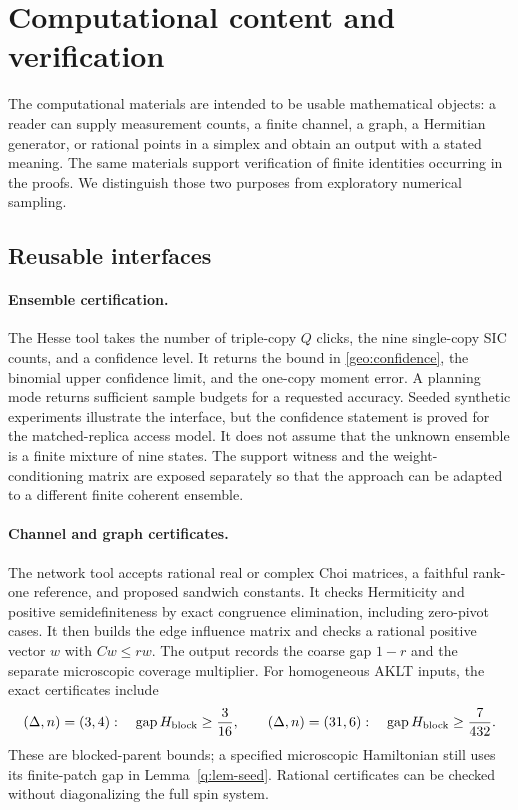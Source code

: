 \section{Computational content and verification}
\label{sec:verification}

The computational materials are intended to be usable mathematical
objects: a reader can supply measurement counts, a finite channel, a graph,
a Hermitian generator, or rational points in a simplex and obtain an output
with a stated meaning.
The same materials support verification of finite identities occurring in
the proofs. We distinguish those two purposes from exploratory numerical
sampling.

\subsection{Reusable interfaces}

\paragraph{Ensemble certification.}
The Hesse tool takes the number of triple-copy $Q$ clicks, the nine
single-copy SIC counts, and a confidence level. It returns the bound in
\eqref{geo:confidence}, the binomial upper confidence limit, and the
one-copy moment error. A planning mode returns sufficient sample budgets
for a requested accuracy. Seeded synthetic experiments illustrate the
interface, but the confidence statement is proved for the matched-replica
access model. It does not assume that the unknown ensemble is a finite
mixture of nine states. The support witness and the weight-conditioning
matrix are exposed separately so that the approach can be adapted to a
different finite coherent ensemble.

\paragraph{Channel and graph certificates.}
The network tool accepts rational real or complex Choi matrices, a
faithful rank-one reference, and proposed sandwich constants. It checks
Hermiticity and positive semidefiniteness by exact congruence elimination,
including zero-pivot cases. It then builds the edge influence matrix and
checks a rational positive vector $w$ with $Cw\le rw$. The output records
the coarse gap $1-r$ and the separate microscopic coverage multiplier.
For homogeneous AKLT inputs, the exact certificates include
\[
 (\Delta,n)=(3,4):\quad\operatorname{gap}H_{\rm block}\ge\frac3{16},
 \qquad
 (\Delta,n)=(31,6):\quad\operatorname{gap}H_{\rm block}\ge\frac7{432}.
\]
These are blocked-parent bounds; a specified microscopic Hamiltonian
still uses its finite-patch gap in Lemma~\ref{q:lem-seed}. Rational
certificates can be checked without diagonalizing the full spin system.

